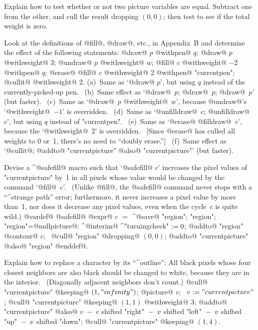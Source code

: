 {{{{\ddangerexercise Explain how to test whether or not two picture variables
are equal.
\answer Subtract one from the other, and cull the result dropping $(0,0)$;
then test to see if the total weight is zero.

\ddangerexercise Look at the definitions of @fill@, @draw@, etc., in
Appendix~B and determine the effect of the following statements:
\begindisplay
{}@draw@ $p$ @withpen@ $q$;\cr
{}@draw@ $p$ @withweight@ 3;\cr
{}@undraw@ $p$ @withweight@ $w$;\cr
{}@fill@ $c$ @withweight@ $-2$ @withpen@ $q$;\cr
{}@erase@ @fill@ $c$ @withweight@ 2 @withpen@ "currentpen";\cr
{}@cullit@ @withweight@ 2.\cr
\enddisplay
\answer (a)~Same as `@draw@ $p$', but using $q$ instead of the
currently-picked-up pen. \ (b)~Same effect as `@draw@~$p$; @draw@~$p$;
@draw@~$p$' (but faster).  \ (c)~Same as `@draw@~$p$ @withweight@~$w$',
because @undraw@'s `@withweight@~$-1$' is overridden.
\ (d)~Same as `@unfilldraw@~$c$; @unfilldraw@~$c$',
 but using $q$ instead of "currentpen".
\ (e)~Same as `@erase@ @filldraw@~$c$', because the `@withweight@~2' is
overridden. \ [Since @erase@ has culled all weights to 0 or~1, there's
no need to ``doubly erase.'']
\ (f)~Same effect as `@cullit@; @addto@ "currentpicture" @also@
"currentpicture"' (but faster).

\ddangerexercise Devise a ^@safefill@ macro such that `@safefill@ $c$' increases
the pixel values of "currentpicture" by~1 in all pixels whose value would
be changed by the command `@fill@~$c$'. \ (Unlike @fill@, the @safefill@ command
never stops with a ``^{strange path}'' error; furthermore, it never increases
a pixel value by more than~1, nor does it decrease any pixel values, even
when the cycle~$c$ is quite wild.)
\answer @vardef@ @safefill@ @expr@ $c$ $=$ ^@save@ "region";\parbreak
\quad@picture@ "region"; "region"=@nullpicture@;\parbreak
\quad^@interim@ ^"turningcheck"$\null:=0$;\parbreak
\quad @addto@ "region" @contour@ $c$; \
 @cull@ "region" @dropping@ $(0,0)$;\parbreak
\quad @addto@ "currentpicture" @also@ "region" @enddef@.

\ddangerexercise Explain how to replace a character by its ``^{outline}'':
All black pixels whose four closest neighbors are also
black should be changed to white, because they are in the interior.
\ (Diagonally adjacent neighbors don't count.)
\answer @cull@ "currentpicture" @keeping@ $(1,"infinity")$;\parbreak
@picture@ $v$; \  $v:="currentpicture"$;\parbreak
@cull@ "currentpicture" @keeping@ $(1,1)$ @withweight@ 3;\parbreak
@addto@ "currentpicture" @also@
 $v\;-\;v$ shifted "right"\parbreak
\qquad $\null-\;v$ shifted "left"
 $\null-\;v$ shifted "up"
 $\null-\;v$ shifted "down";\parbreak
@cull@ "currentpicture" @keeping@ $(1,4)$.

}}}}
